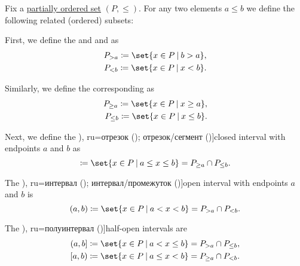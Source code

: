 \begin{definition}\label{def:order_interval}
  Fix a \hyperref[def:partially_ordered_set]{partially ordered set} \( (P, \leq) \). For any two elements \( a \leq b \) we define the following related (ordered) subsets:

  \begin{thmenum}
     First, we define the  and  and as
    \begin{equation*}
      \begin{aligned}
        P_{>a} \coloneqq \set{ x \in P \given b > a },
        \\
        P_{<b} \coloneqq \set{ x \in P \given x < b }.
      \end{aligned}
    \end{equation*}

    Similarly, we define the corresponding  as
    \begin{equation*}
      \begin{aligned}
        P_{\geq a} \coloneqq \set{ x \in P \given x \geq a },
        \\
        P_{\leq b} \coloneqq \set{ x \in P \given x \leq b }.
      \end{aligned}
    \end{equation*}

     Next, we define the \term[bg=затворен интервал (\cite[39]{Тагамлицки1971Диф}), ru=отрезок (\cite[82]{АлександровМаркушевичХинчин1951ЭнциклопедияТом1}); отрезок/сегмент (\cite[def. 6]{Александров1977Топология})]{closed interval} with endpoints \( a \) and \( b \) as
    \begin{equation*}
      [a, b] \coloneqq \set{ x \in P \given a \leq x \leq b } = P_{\geq a} \cap P_{\leq b}.
    \end{equation*}

     The \term[bg=отворен интервал (\cite[39]{Тагамлицки1971Диф}), ru=интервал (\cite[82]{АлександровМаркушевичХинчин1951ЭнциклопедияТом1}); интервал/промежуток (\cite[def. 6]{Александров1977Топология})]{open interval} with endpoints \( a \) and \( b \) is
    \begin{equation*}
      (a, b) \coloneqq \set{ x \in P \given a < x < b } = P_{> a} \cap P_{< b}.
    \end{equation*}

     The \term[bg=полузатворен интервал (\cite[39]{Тагамлицки1971Диф}), ru=полуинтервал (\cite[82]{АлександровМаркушевичХинчин1951ЭнциклопедияТом1})]{half-open intervals} are
    \begin{equation*}
      \begin{aligned}
        (a, b] \coloneqq \set{ x \in P \given a < x \leq b } = P_{> a} \cap P_{\leq b},
        \\
        [a, b) \coloneqq \set{ x \in P \given a \leq x < b } = P_{\geq a} \cap P_{< b}.
      \end{aligned}
    \end{equation*}
  \end{thmenum}
\end{definition}
